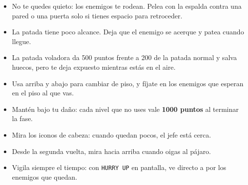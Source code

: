 \begin{itemize}
\item No te quedes quieto: los enemigos te rodean. Pelea con la espalda contra una pared o una puerta solo si tienes espacio para retroceder.
\item La patada tiene poco alcance. Deja que el enemigo se acerque y patea cuando llegue.
\item La patada voladora da 500 puntos frente a 200 de la patada normal y salva huecos, pero te deja expuesto mientras est\'as en el aire.
\item Usa arriba y abajo para cambiar de piso, y f\'ijate en los enemigos que esperan en el piso al que vas.
\item Mant\'en bajo tu da\~no: cada nivel que no uses vale \textbf{1000 puntos} al terminar la fase.
\item Mira los iconos de cabeza: cuando quedan pocos, el jefe est\'a cerca.
\item Desde la segunda vuelta, mira hacia arriba cuando oigas al p\'ajaro.
\item Vigila siempre el tiempo: con \texttt{HURRY UP} en pantalla, ve directo a por los enemigos que quedan.
\end{itemize}
